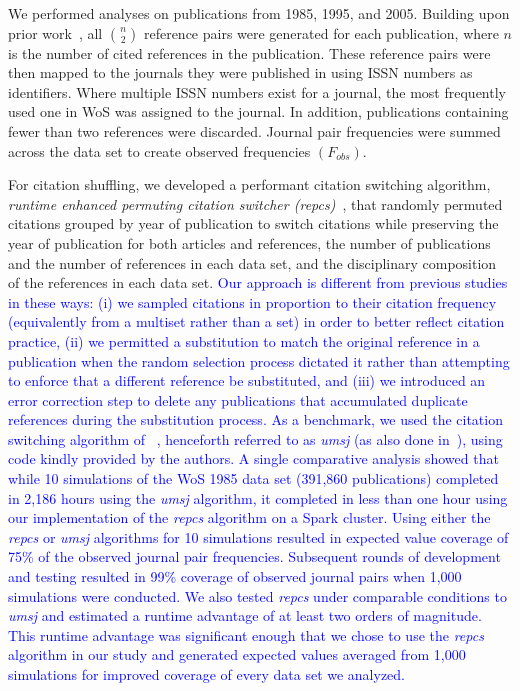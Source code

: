 \documentclass[NETN]{stjour}
\begin{document}
We performed analyses on publications from 1985, 1995, and 2005. Building upon prior work~\citep{uzzi_atypical_2013}, all ${n \choose 2}$ reference pairs were generated for each publication, where $n$ is the number of cited references in the publication. These reference pairs were then mapped to the journals they were published in using ISSN numbers as identifiers. Where multiple ISSN numbers exist for a journal, the most frequently used one in WoS was assigned to the journal. In addition, publications containing fewer than two references were discarded. Journal pair frequencies were summed across the data set to create observed frequencies $(F_{obs})$. 

For citation shuffling, we developed a performant citation switching algorithm, \emph{runtime enhanced permuting citation switcher (repcs)}~\citep{GithubERNIE2019}, that randomly permuted citations grouped by year of publication to switch citations while preserving the year of publication for both articles and references, the number of publications and the number of references in each data set, and the disciplinary composition of the references in each data set. 
\textcolor{blue}{Our approach is different from previous studies in these ways: (i) we sampled citations in proportion to their citation frequency (equivalently from a multiset rather than a set) in order to better reflect citation practice, 
(ii) we permitted a substitution to match the original reference in a publication when the random selection process dictated it rather than attempting to enforce that a different reference be substituted, and (iii) we introduced an error correction step to delete any publications that accumulated duplicate references during the substitution process.  As a benchmark, we used the citation switching algorithm of ~\cite{uzzi_atypical_2013}, henceforth referred to  as \emph{umsj} (as also done in~\cite{boyack_vs_uzzi_2014}), using code kindly provided by the authors. A single comparative analysis showed that while 10 simulations of the WoS 1985 data set (391,860 publications) completed in 2,186 hours using the \emph{umsj} algorithm, it completed in less than one hour using our implementation of the \emph{repcs}   algorithm on a Spark  cluster. Using either the \emph{repcs}   or \emph{umsj} algorithms for 10 simulations resulted in expected value coverage of 75\% of the observed journal pair frequencies. Subsequent rounds of development and testing resulted in 99\% coverage of observed journal pairs when 1,000 simulations were conducted. We also tested \emph{repcs}  under comparable conditions to \emph{umsj} and estimated a runtime advantage of at least two orders of magnitude. This runtime advantage was significant enough that we chose to use the \emph{repcs}   algorithm in our study and generated expected values averaged from 1,000 simulations for improved coverage of every data set we analyzed.} 
\end{document}
